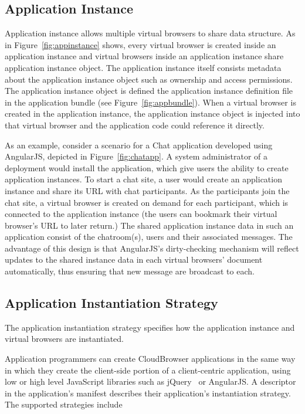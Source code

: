 \subsection{Application Instance}
\label{sec:appins}
\appinstancefig{}


Application instance allows multiple virtual browsers to share data structure.
As in Figure~\ref{fig:appinstance} shows, 
every virtual browser is created inside an application instance
and virtual browsers inside an application instance share application instance object.
The application instance itself
consists metadata about the application instance object
 such as ownership and access permissions.
The application instance object is defined
the application instance definition file 
in the application bundle (see Figure~\ref{fig:appbundle}).
When a virtual browser is created in the application instance,
the application instance object is injected into that virtual browser
and the application code could reference it directly.

\chatappfig{}

As an example, consider a scenario for a Chat application developed using AngularJS,
depicted in Figure~\ref{fig:chatapp}.
A system administrator of a \cb deployment would install the application, which give users the
ability to create application instances. To start a chat site, a user would create
an application instance and share its URL with chat participants.  As the participants join
the chat site, a virtual browser is created on demand for each participant, which is connected
to the application instance (the users can bookmark their virtual browser's URL to later return.)
The shared application instance data in such an application
consist of the chatroom(s), users and their associated messages.  The advantage of this design
is that AngularJS's dirty-checking mechanism will reflect updates to the shared instance data
in each virtual browsers' document automatically, thus ensuring that new message are broadcast
to each.



\subsection{Application Instantiation Strategy}
\label{sec:appinstantiation}

The application instantiation strategy specifies
how the application instance and virtual browsers are instantiated.

Application programmers can create CloudBrowser applications in the same way in which
they create the client-side portion of a client-centric application, using low or high level
JavaScript libraries such as jQuery~\cite{jquery} or AngularJS.  
A descriptor in the application's manifest describes 
their application's instantiation strategy.
The supported strategies include

